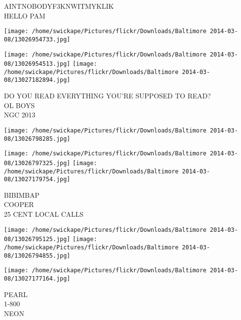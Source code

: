 \documentclass[10pt,letterpaper]{article}
\begin{document}
AINTNOBODYF3KNWITMYKLIK\\
HELLO PAM
\pagebreak

\texttt{[image: /home/swickape/Pictures/flickr/Downloads/Baltimore 2014-03-08/13026954733.jpg]}

\vspace{0.25in}
\texttt{[image: /home/swickape/Pictures/flickr/Downloads/Baltimore 2014-03-08/13026954513.jpg]}
\texttt{[image: /home/swickape/Pictures/flickr/Downloads/Baltimore 2014-03-08/13027182894.jpg]}

DO YOU READ EVERYTHING YOU'RE SUPPOSED TO READ?\\
OL BOYS\\
NGC 2013
\pagebreak

\texttt{[image: /home/swickape/Pictures/flickr/Downloads/Baltimore 2014-03-08/13026798285.jpg]}

\vspace{0.25in}
\texttt{[image: /home/swickape/Pictures/flickr/Downloads/Baltimore 2014-03-08/13026797325.jpg]}
\texttt{[image: /home/swickape/Pictures/flickr/Downloads/Baltimore 2014-03-08/13027179754.jpg]}

BIBIMBAP\\
COOPER\\
25 CENT LOCAL CALLS
\pagebreak

\texttt{[image: /home/swickape/Pictures/flickr/Downloads/Baltimore 2014-03-08/13026795125.jpg]}
\texttt{[image: /home/swickape/Pictures/flickr/Downloads/Baltimore 2014-03-08/13026794855.jpg]}

\texttt{[image: /home/swickape/Pictures/flickr/Downloads/Baltimore 2014-03-08/13027177164.jpg]}

PEARL\\
1{-}800\\
NEON
\pagebreak
\end{document}
